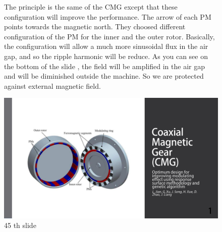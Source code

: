 \begin{figure}[H]
    \begin{minipage}{.45\linewidth}
    
The principle is the same of the CMG except that these configuration will improve the performance.
The arrow of each PM points towards the magnetic north. They choosed different configuration of the PM for the inner and the outer rotor.
Basically, the configuration will allow a much more sinusoidal flux in the air gap, and so the ripple harmonic will be reduce. As you can see on the bottom of the slide , the field will be amplified in the air gap and will be diminished outside the machine. So we are protected against external magnetic field.
 
       
    \end{minipage}
    \hfill%
    \begin{minipage}[c]{.45\linewidth}
        \centering
        \includegraphics[page={45},width=\textwidth]{LELEC2311.allow.pdf}
        \caption{45 th slide}
    \end{minipage}
\end{figure}




